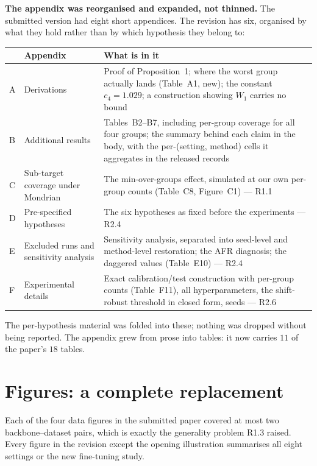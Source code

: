 \documentclass[11pt,a4paper]{article}
\begin{document}
\textbf{The appendix was reorganised and expanded, not thinned.} The submitted version had
eight short appendices. The revision has six, organised by what they hold rather than by which
hypothesis they belong to:

\begin{center}
\begin{tabular}{@{}L{1.0cm}L{5.6cm}L{7.6cm}@{}}
\toprule
& \textbf{Appendix} & \textbf{What is in it} \\
\midrule
A & Derivations & Proof of Proposition~1; where the worst group actually lands
(Table~A1, new); the constant $c_{4}=1.029$; a construction showing $W_1$ carries no bound \\
\addlinespace
B & Additional results & Tables~B2--B7, including per-group coverage for all four groups;
the summary behind each claim in the body, with the per-(setting, method) cells it aggregates in
the released records \\
\addlinespace
C & Sub-target coverage under Mondrian & The min-over-groups effect, simulated at our own
per-group counts (Table~C8, Figure~C1) --- R1.1 \\
\addlinespace
D & Pre-specified hypotheses & The six hypotheses as fixed before the experiments --- R2.4 \\
\addlinespace
E & Excluded runs and sensitivity analysis & Sensitivity analysis, separated into seed-level and
method-level restoration; the AFR diagnosis; the daggered values (Table~E10) --- R2.4 \\
\addlinespace
F & Experimental details & Exact calibration/test construction with per-group counts
(Table~F11), all hyperparameters, the shift-robust threshold in closed form, seeds --- R2.6 \\
\bottomrule
\end{tabular}
\end{center}

The per-hypothesis material was folded into these; nothing was dropped without being reported. The
appendix grew from prose into tables: it now carries $11$ of the paper's $18$ tables.

\section{Figures: a complete replacement}

Each of the four data figures in the submitted paper covered at most two backbone--dataset pairs,
which is exactly the generality problem R1.3 raised. Every figure in the revision except the opening illustration
summarises all eight settings or the new fine-tuning study.
\end{document}
